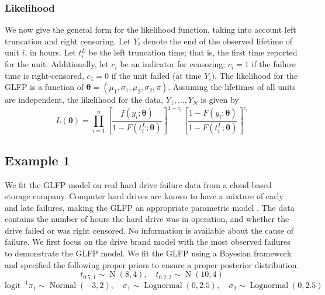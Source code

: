 \documentclass[12pt]{article}
\newcommand{\op}{\operatorname}
\begin{document}
\subsubsection{Likelihood}
We now give the general form for the likelihood function, taking into account left truncation and right censoring.  Let $Y_{i}$ denote the end of the observed lifetime of unit $i$, in hours.  Let $t_i^L$ be the left truncation time; that is, the first time reported for the unit.  Additionally, let $c_i$ be an indicator for censoring; $c_i=1$ if the failure time is right-censored, $c_1=0$ if the unit failed (at time $Y_i$). The likelihood for the GLFP is a function of $\bm{\theta} = (\mu_1, \sigma_1, \mu_2, \sigma_2, \pi)$.  Assuming the lifetimes of all units are independent, the likelihood for the data, $Y_1,\ldots,Y_N$ is given by
\begin{equation*}
L(\bm{\theta})= \prod_{i=1}^{n} \left[\frac{f(y_i;\bm{\theta})}{1-F(t_i^L;\bm{\theta})}\right]^{1-c_i} \left[ \frac{1-F(y_i;\bm{\theta})}{1-F(t_i^L;\bm{\theta})} \right]^{c_i}
\end{equation*}

\subsection{Example 1}
\label{subsec:ex1}
We fit the GLFP model on real hard drive failure data from a cloud-based storage company.  Computer hard drives are known to have a mixture of early and late failures, making the GLFP an appropriate parametric model \cite{chan}.  The data contains the number of hours the hard drive was in operation, and whether the drive failed or was right censored.  No information is available about the cause of failure.  We first focus on the drive brand model with the most observed failures to demonstrate the GLFP model.  We fit the GLFP using a Bayesian framework and specified the following proper priors to ensure a proper posterior distribution.
$$t_{0.5,1} \sim \op{N}(8,4), \quad t_{0.2,2} \sim \op{N}(10,4)$$
$$\mbox{logit}^{-1}\pi_1 \sim \op{Normal}(-3,2),\quad \sigma_1 \sim \op{Lognormal}(0, 2.5), \quad \sigma_2 \sim \op{Lognormal}(0, 2.5) $$
\end{document}
